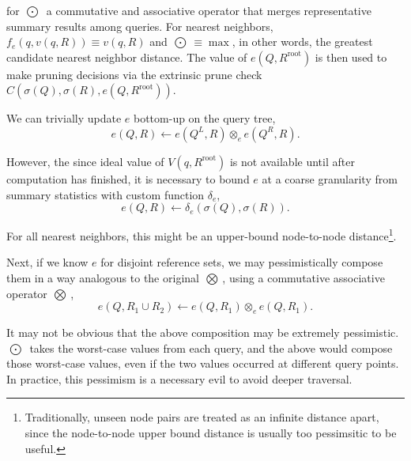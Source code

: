 \documentclass[twoside,leqno,twocolumn]{article}
\newcommand{\authornote}[1]{(\footnote{Note to self: #1})}
\newcommand{\union}{\cup}
\newcommand{\summary}{\delta}
\newcommand{\kdroot}[1]{#1^{\text{root}}}
\newcommand{\kdleft}[1]{#1^{\!L}}
\newcommand{\kdright}[1]{#1^{\!R}}
\newcommand{\nameOp}[2]{\mathop{#1\nolimits\!\!_{#2}}}
\newcommand{\nameop}[2]{#1_{\!#2}}
\newcommand{\myOp}[1]{\nameOp{\bigotimes}{#1}}
\newcommand{\myop}[1]{\nameop{\otimes}{#1}}
\newcommand{\letterqr}{v}
\newcommand{\outqr}{V}
\newcommand{\inqr}{v}
\newcommand{\Opqr}{\myOp{\letterqr}}
\newcommand{\lettermu}{e}
\newcommand{\inmu}{e}
\newcommand{\Outopmu}{\nameOp{\bigodot}{\lettermu}}%
\newcommand{\outopmu}{\myop{\lettermu}}
\newcommand{\Opmu}{\myOp{\lettermu}}
\newcommand{\opmu}{\myop{\lettermu}}
\newcommand{\fmu}{f_{\lettermu}}
\newcommand{\deltamu}{\summary_{\lettermu}}
\newcommand{\canprunemu}{C}
\newcommand{\outstat}{\sigma}
\begin{document}
\noindent for $\Outopmu$ a commutative and associative operator that merges representative summary results among queries.
For nearest neighbors, $\fmu(q, \inqr(q, R)) \equiv \inqr(q, R)$ and $\Outopmu \equiv \max$, in other words, the greatest candidate nearest neighbor distance.
The value of $\inmu(Q, \kdroot{R})$ is then used to make pruning decisions via the extrinsic prune check $\canprunemu(\outstat(Q), \outstat(R), \inmu(Q, \kdroot{R}))$.

We can trivially update $e$ bottom-up on the query tree,
\begin{equation}
\inmu(Q, R) \gets \inmu(\kdleft{Q}, R) \outopmu \inmu(\kdright{Q}, R).
\label{eqn:muchild}
\end{equation}

\noindent
However, the since ideal value of $\outqr(q, \kdroot{R})$ is not available until after computation has finished, it is necessary to bound $\inmu$ at a coarse granularity from summary statistics with custom function $\deltamu$,
\begin{equation}
\inmu(Q, R) \gets \deltamu(\outstat(Q), \outstat(R)).
\label{eqn:mudelta}
\end{equation}

\noindent
For all nearest neighbors, this might be an upper-bound node-to-node distance\footnote{Traditionally, unseen node pairs are treated as an infinite distance apart, since the node-to-node upper bound distance is usually too pessimsitic to be useful.}.

Next, if we know $\inmu$ for disjoint reference sets, we may pessimistically compose them in a way analogous to the original $\Opqr$, using a commutative associative operator $\Opmu$,
\begin{equation}
\inmu(Q, R_1 \union R_2) \gets \inmu(Q, R_1) \opmu \inmu(Q, R_1).
\label{eqn:mucompose}
\end{equation}

\noindent
It may not be obvious that the above composition may be extremely pessimistic.
$\Outopmu$ takes the worst-case values from each query, and the above would compose those worst-case values, even if the two values occurred at different query points.
In practice, this pessimism is a necessary evil to avoid deeper traversal.
\end{document}
